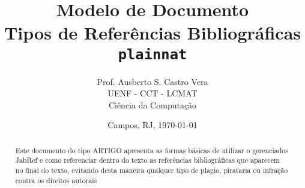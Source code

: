 \documentclass[12pt]{article}
\title{\bf Modelo de Documento \\  Tipos de Refer\^{e}ncias Bibliogr\'{a}ficas \\ \texttt{plainnat}}
\author{\textsf{Prof. Ausberto S. Castro Vera} \\
	            UENF - CCT - LCMAT \\
	            Ci\^{e}ncia da Computa\c{c}\~{a}o
	   }
\date{Campos, RJ, \today}    %
\begin{document}
\maketitle     %


\begin{abstract}
Este documento do tipo ARTIGO apresenta as formas b\'{a}sicas de utilizar o gerenciados JabRef e como referenciar dentro do texto as refer\^{e}ncias bibliogr\'{a}ficas que aparecem no final do texto, evitando desta maneira qualquer tipo de plagio, pirataria ou infra\c{c}\~{a}o contra os direitos autorais
\end{abstract}

\newpage
{}
\tableofcontents
\newpage





\end{document}
